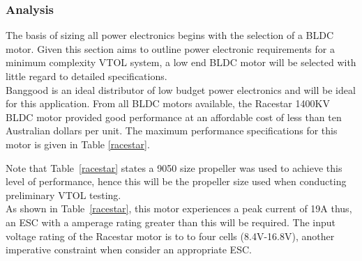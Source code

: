 \subsubsection{Analysis}

The basis of sizing all power electronics begins with the selection of a BLDC motor. Given this section aims to outline power electronic requirements for a minimum complexity VTOL system, a low end BLDC motor will be selected with little regard to detailed specifications.\\

Banggood is an ideal distributor of low budget power electronics and will be ideal for this application. From all BLDC motors available, the Racestar 1400KV BLDC motor provided good performance at an affordable cost of less than ten Australian dollars per unit. The maximum performance specifications for this motor is given in Table \ref{racestar}.

\begin{table}[H]
\caption{Maximum Performance Specification of Racestar BLDC Motor}
\label{racestar}
\end{table}

Note that Table~\ref{racestar} states a 9050 size propeller was used to achieve this level of performance, hence this will be the propeller size used when conducting preliminary VTOL testing.\\

As shown in Table~\ref{racestar}, this motor experiences a peak current of 19A thus, an ESC with a amperage rating greater than this will be required. The input voltage rating of the Racestar motor is to to four cells (8.4V-16.8V), another imperative constraint when consider an appropriate ESC.\\

